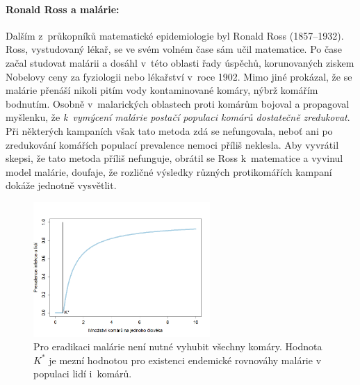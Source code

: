 
\paragraph{Ronald Ross a malárie:} Dalším z~průkopníků matematické epidemiologie byl Ronald Ross (1857--1932). Ross, vystudovaný lékař, se ve svém volném čase sám učil matematice. Po čase začal studovat malárii a dosáhl v~této oblasti řady úspěchů, korunovaných ziskem Nobelovy ceny za fyziologii nebo lékařství v~roce 1902. Mimo jiné prokázal, že se malárie přenáší nikoli pitím vody kontaminované komáry, nýbrž komářím bodnutím. Osobně v~malarických oblastech proti komárům bojoval a propagoval myšlenku, že \emph{k~vymýcení malárie postačí populaci komárů dostatečně zredukovat}. Při některých kampaních však tato metoda zdá se nefungovala, neboť ani po zredukování komářích populací prevalence nemoci příliš neklesla. Aby vyvrátil skepsi, že tato metoda příliš nefunguje, obrátil se Ross k~matematice a vyvinul model malárie, doufaje, že rozličné výsledky různých protikomářích kampaní dokáže jednotně vysvětlit. 

\begin{figure}[ht]
\begin{center}
	\includegraphics[width=0.6\textwidth]{pic/ross_plot.png}
\end{center}
\caption{Pro eradikaci malárie není nutné vyhubit všechny komáry. Hodnota $K^*$ je mezní hodnotou pro existenci endemické rovnováhy malárie v populaci lidí i~komárů.}
\label{ross1}
\end{figure}

